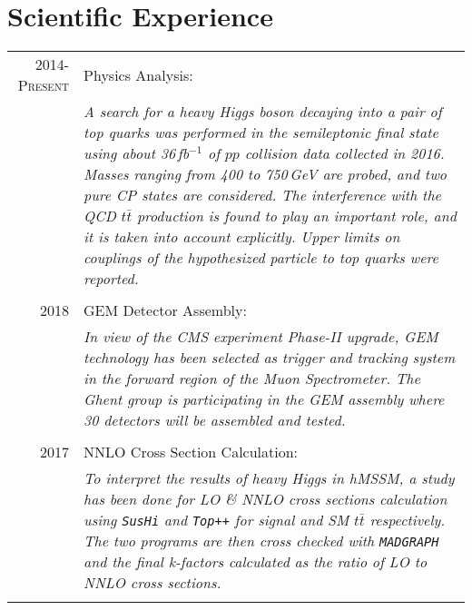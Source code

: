 \documentclass[a4paper,10pt]{article}
\begin{document}
\section{Scientific Experience}
\begin{tabular}{r|p{11.60cm}}
\textsc{2014-Present} & Physics Analysis: \\&\emph{A search for a heavy Higgs boson decaying into a pair of top quarks was performed in the semileptonic final state using about 36\,fb$^{-1}$ of $pp$ collision data collected in 2016. Masses ranging from 400 to 750\,GeV are probed, and two pure \textsc{CP} states are considered. The interference with the QCD $t\bar t$ production is found to play an important role, and it is taken into account explicitly. Upper limits on couplings of the hypothesized particle to top quarks were reported. }\\\multicolumn{2}{c}{} \\
\textsc{2018} & GEM Detector Assembly:\\&\emph{In view of the CMS experiment Phase-II upgrade, GEM technology has been selected as trigger and tracking system in the forward region of the Muon Spectrometer. The Ghent group is participating in the GEM assembly where 30 detectors will be assembled and tested.}\\\multicolumn{2}{c}{} \\
\textsc{2017} & NNLO Cross Section Calculation:\\&\emph{To interpret the results of heavy Higgs in hMSSM, a study has been done for LO \& NNLO cross sections calculation using \texttt{SusHi} and \texttt{Top++} for signal and SM $t\bar t$ respectively. The two programs are then cross checked with \texttt{MADGRAPH} and the final k-factors calculated as the ratio of LO to NNLO cross sections.}\\\multicolumn{2}{c}{} 
\end{tabular}\newline
\end{document}
